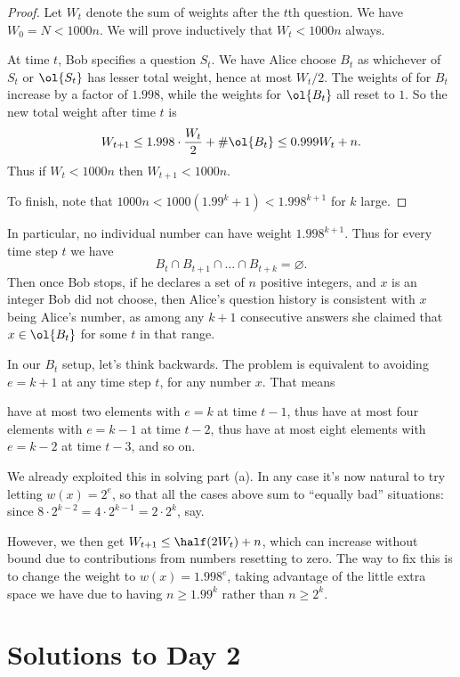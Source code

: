 \begin{proof}
  Let $W_{t}$ denote the sum of weights after the $t$th question.
  We have $W_0 = N < 1000n$.
  We will prove inductively that $W_t < 1000n$ always.

  At time $t$, Bob specifies a question $S_t$.
  We have Alice choose $B_t$ as whichever of $S_t$ or $\ol{S_t}$
  has lesser total weight, hence at most $W_t/2$.
  The weights of for $B_t$ increase by a factor of $1.998$,
  while the weights for $\ol{B_t}$ all reset to $1$.
  So the new total weight after time $t$ is
  \[ W_{t+1} \le 1.998 \cdot \frac{W_t}{2}
    + \# \ol{B_t} \le 0.999 W_t + n. \]
  Thus if $W_t < 1000n$ then $W_{t+1} < 1000n$.

  To finish, note that
  $1000n < 1000 \left( 1.99^k + 1 \right) < 1.998^{k+1}$
  for $k$ large.
\end{proof}

In particular, no individual number can have weight $1.998^{k+1}$.
Thus for every time step $t$ we have
\[ B_t \cap B_{t+1} \cap \dots \cap B_{t+k} = \varnothing. \]
Then once Bob stops, if he declares a set of $n$ positive integers,
and $x$ is an integer Bob did not choose,
then Alice's question history is consistent with $x$ being Alice's number,
as among any $k+1$ consecutive answers
she claimed that $x \in \ol{B_t}$ for some $t$ in that range.

\begin{remark*}
  [Motivation]
  In our $B_t$ setup, let's think backwards.
  The problem is equivalent to avoiding $e = k+1$ at any time step $t$,
  for any number $x$.
  That means
  \begin{itemize}
    \ii have at most two elements with $e = k$ at time $t-1$,
    \ii thus have at most four elements with $e = k-1$ at time $t-2$,
    \ii thus have at most eight elements with $e = k-2$ at time $t-3$,
    \ii and so on.
  \end{itemize}
  We already exploited this in solving part (a).
  In any case it's now natural to try letting $w(x) = 2^e$,
  so that all the cases above sum to ``equally bad'' situations:
  since $8 \cdot 2^{k-2} = 4 \cdot 2^{k-1} = 2 \cdot 2^k$, say.

  However, we then get $W_{t+1} \le \half (2W_t) + n$,
  which can increase without bound due to contributions
  from numbers resetting to zero.
  The way to fix this is to change the weight to $w(x) = 1.998^e$,
  taking advantage of the little extra space we have
  due to having $n \ge 1.99^k$ rather than $n \ge 2^k$.
\end{remark*}
\pagebreak

\section{Solutions to Day 2}
